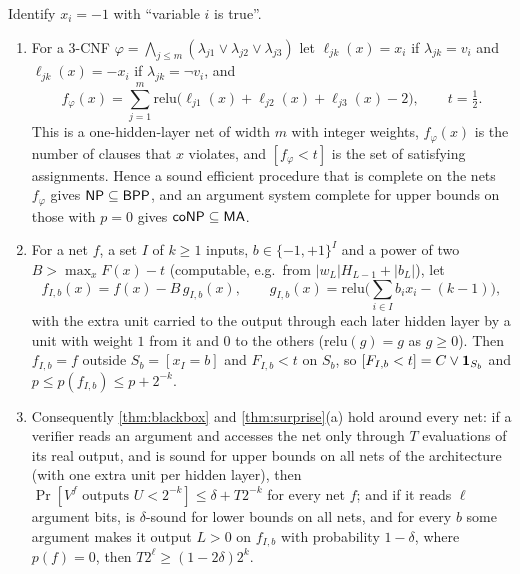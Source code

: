 \begin{proposition}\label{prop:nets-hard}
Identify $x_i=-1$ with ``variable $i$ is true''.
\begin{enumerate}[label=(\alph*)]
\item For a 3-CNF $\varphi=\bigwedge_{j\le m}(\lambda_{j1}\vee\lambda_{j2}\vee\lambda_{j3})$ let
$\ell_{jk}(x)=x_i$ if $\lambda_{jk}=v_i$ and $\ell_{jk}(x)=-x_i$ if $\lambda_{jk}=\neg v_i$, and
\[
f_\varphi(x)=\sum_{j=1}^m\mathrm{relu}\big(\ell_{j1}(x)+\ell_{j2}(x)+\ell_{j3}(x)-2\big),\qquad t=\tfrac12 .
\]
This is a one-hidden-layer net of width $m$ with integer weights, $f_\varphi(x)$ is the
number of clauses that $x$ violates, and $[f_\varphi<t]$ is the set of satisfying
assignments. Hence a sound efficient procedure that is complete on the nets $f_\varphi$
gives $\mathsf{NP}\subseteq\mathsf{BPP}$, and an argument system complete for upper bounds on those
with $p=0$ gives $\mathsf{coNP}\subseteq\mathsf{MA}$.
\item For a net $f$, a set $I$ of $k\ge1$ inputs, $b\in\{-1,+1\}^I$ and a power of two
$B>\max_xF(x)-t$ (computable, e.g.\ from $|w_L|H_{L-1}+|b_L|$), let
\[
f_{I,b}(x)=f(x)-B\,g_{I,b}(x),\qquad g_{I,b}(x)=\mathrm{relu}\Big(\sum_{i\in I}b_ix_i-(k-1)\Big),
\]
with the extra unit carried to the output through each later hidden layer by a unit
with weight $1$ from it and $0$ to the others ($\mathrm{relu}(g)=g$ as $g\ge0$). Then
$f_{I,b}=f$ outside $S_b=[x_I=b]$ and $F_{I,b}<t$ on $S_b$, so $[F_{I,b}<t]=C\vee\mathbf{1}_{S_b}$
and $p\le p(f_{I,b})\le p+2^{-k}$.
\item Consequently \cref{thm:blackbox} and \cref{thm:surprise}(a) hold around every
net: if a verifier reads an argument and accesses the net only through $T$ evaluations
of its real output, and is sound for upper bounds on all nets of the architecture
(with one extra unit per hidden layer), then
$\Pr[V^f\text{ outputs }U<2^{-k}]\le\delta+T2^{-k}$ for every net $f$; and if it reads
$\ell$ argument bits, is $\delta$-sound for lower bounds on all nets, and for every $b$
some argument makes it output $L>0$ on $f_{I,b}$ with probability $1-\delta$, where
$p(f)=0$, then $T2^\ell\ge(1-2\delta)2^k$.
\end{enumerate}
\end{proposition}

